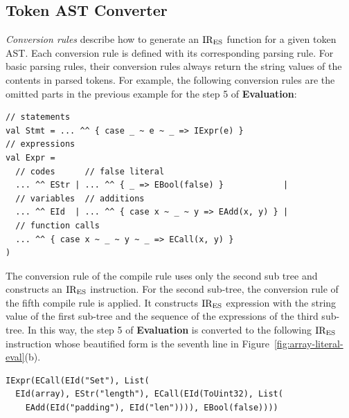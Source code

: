 \subsection{Token AST Converter}
\textit{Conversion rules} describe how to generate an \( \text{IR}_\text{ES} \) function for a
given token AST.  Each conversion rule is defined with its corresponding parsing
rule.  For basic parsing rules, their conversion rules always return the string
values of the contents in parsed tokens.  For example, the following conversion
rules are the omitted parts in the previous example for the step 5 of
\textbf{Evaluation}:
\begin{lstlisting}[style=myScalastyle]
// statements
val Stmt = ... ^^ { case _ ~ e ~ _ => IExpr(e) }
// expressions
val Expr =
  // codes      // false literal
  ... ^^ EStr | ... ^^ { _ => EBool(false) }            |
  // variables  // additions
  ... ^^ EId  | ... ^^ { case x ~ _ ~ y => EAdd(x, y) } |
  // function calls
  ... ^^ { case x ~ _ ~ y ~ _ => ECall(x, y) }
)
\end{lstlisting}
The conversion rule of the  compile rule uses only the second sub
tree and constructs an  \( \text{IR}_\text{ES} \) instruction.  For the second
sub-tree, the conversion rule of the fifth  compile rule is
applied. It constructs  \( \text{IR}_\text{ES} \) expression with the string value
of the first sub-tree and the sequence of the expressions of the third sub-tree.
In this way, the step 5 of \textbf{Evaluation} is converted to the following \(
\text{IR}_\text{ES} \) instruction whose beautified form is the seventh line
in Figure~\ref{fig:array-literal-eval}(b).
\begin{lstlisting}[style=ires]
IExpr(ECall(EId("Set"), List(
  EId(array), EStr("length"), ECall(EId(ToUint32), List(
    EAdd(EId("padding"), EId("len")))), EBool(false))))
\end{lstlisting}


